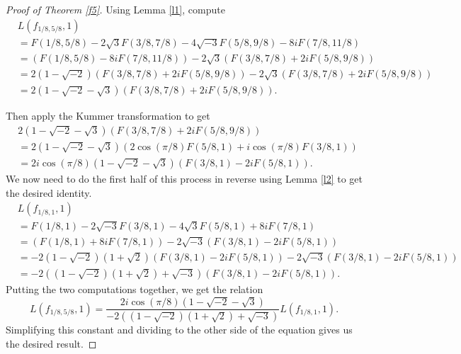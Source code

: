 \documentclass[12pt]{amsart}
\theoremstyle{definition}
\theoremstyle{remark}
\begin{document}
 
\begin{proof}[Proof of Theorem \ref{f5}]
    Using Lemma \ref{l1}, compute \begin{align*}
  &  L(f_{1/8,5/8},1)\\&=F(1/8, 5/8) - 2 \sqrt{3}F(3/8, 7/8) - 4 \sqrt{-3} F(5/8, 9/8) - 
 8 i F(7/8, 11/8)\\&
=(F(1/8, 5/8)- 8 i F(7/8, 11/8)) -2 \sqrt{3}(F(3/8, 7/8) + 2i F(5/8, 9/8))\\&
=2(1-\sqrt{-2})(F(3/8,7/8)+2iF(5/8,9/8))-2 \sqrt{3}(F(3/8, 7/8) + 2i F(5/8, 9/8))\\&
=2(1-\sqrt{-2}-\sqrt{3})(F(3/8,7/8)+2iF(5/8,9/8)).
\end{align*} 

Then apply the Kummer transformation to get \begin{align*}
 &   2(1-\sqrt{-2}-\sqrt{3})(F(3/8,7/8)+2iF(5/8,9/8))\\&
=2(1-\sqrt{-2}-\sqrt{3})(2 \cos(\pi/8) F(5/8, 1)+i\cos(\pi/8)F(3/8,1))\\&
=2i\cos(\pi/8)(1-\sqrt{-2}-\sqrt{3})(F(3/8,1)-2iF(5/8,1)).
\end{align*}
We now need to do the first half of this process in reverse using Lemma \ref{l2} to get the desired identity. 
\begin{align*}
  &  L(f_{1/8,1},1)\\&=F(1/8, 1) - 2 \sqrt{-3} F(3/8, 1) - 4 \sqrt{3} F(5/8, 1) + 8 i F(7/8, 1)\\&
=(F(1/8, 1)+ 8 i F(7/8, 1)) -2 \sqrt{-3}(F(3/8, 1) - 2i F(5/8, 1))\\&
=-2(1 - \sqrt{-2}) (1 + \sqrt{2})(F(3/8,1)-2iF(5/8,1))-2 \sqrt{-3}(F(3/8, 1) - 2i F(5/8, 1))\\&
=-2((1 - \sqrt{-2}) (1 + \sqrt{2})+\sqrt{-3}
)(F(3/8,1)-2iF(5/8,1)).
\end{align*} 
Putting the two computations together, we get the relation $$L(f_{1/8,5/8},1)=\frac{2i\cos(\pi/8)(1-\sqrt{-2}-\sqrt{3})}{-2((1 - \sqrt{-2}) (1 + \sqrt{2})+\sqrt{-3})}L(f_{1/8,1},1).$$ Simplifying this constant and dividing to the other side of the equation gives us the desired result.
\end{proof}



\end{document}
